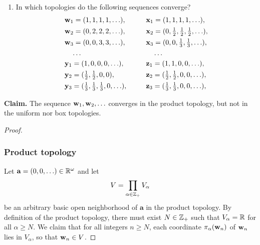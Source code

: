 \begin{solution}
    \begin{enumerate}[label={(\alph*)}, align=left, leftmargin=\parindent, listparindent=\parindent, labelwidth=0pt, itemindent=!]
        \addtocounter{enumi}{1} 
        \item In which topologies do the following sequences converge?
        \begin{alignat*}{2}
            & \mathbf{w}_1 = (1, 1, 1, 1, \ldots),\qquad   & & \mathbf{x}_1 = (1, 1, 1, 1, \ldots), \\
            & \mathbf{w}_2 = (0, 2, 2, 2, \ldots),\qquad   & & \mathbf{x}_2 = (0, \tfrac{1}{2}, \tfrac{1}{2}, \tfrac{1}{2}, \ldots), \\
            & \mathbf{w}_3 = (0, 0, 3, 3, \ldots),\qquad   & & \mathbf{x}_3 = (0, 0, \tfrac{1}{3}, \tfrac{1}{3}, \ldots), \\
            & \quad\ldots                           & & \quad\ldots \\
            & \mathbf{y}_1 = (1, 0, 0, 0, \ldots),\qquad   & & \mathbf{z}_1 = (1, 1, 0, 0, \ldots), \\
            & \mathbf{y}_2 = (\tfrac{1}{2}, \tfrac{1}{2}, 0, 0),                       & & \mathbf{z}_2 = (\tfrac{1}{2}, \tfrac{1}{2}, 0, 0, \ldots), \\
            & \mathbf{y}_3 = (\tfrac{1}{3}, \tfrac{1}{3}, \tfrac{1}{3}, 0, \ldots),    & & \mathbf{z}_3 = (\tfrac{1}{3}, \tfrac{1}{3}, 0, 0, \ldots), \\
        \end{alignat*}
    \end{enumerate}
    \textbf{Claim.} The sequence $\mathbf{w}_1, \mathbf{w}_2, \ldots$ converges in the product topology, but not in the uniform nor box topologies.
    \begin{proof}~

        \subsubsection*{Product topology}
        Let $\mathbf{a} = (0, 0, \ldots) \in \mathbb{R}^\omega$ and let
        \begin{equation*}
            V = \prod_{\alpha \in \mathbb{Z}_+} V_\alpha
        \end{equation*}
        be an arbitrary basic open neighborhood of $\mathbf{a}$ in the product topology.
        By definition of the product topology, there must exist $N \in \mathbb{Z}_+$ such that $V_\alpha = \mathbb{R}$ for all $\alpha \geq N$.
        We claim that for all integers $n \geq N$, each coordinate $\pi_\alpha(\mathbf{w}_n)$ of $\mathbf{w}_n$ lies in $V_\alpha$, so that $\mathbf{w}_n \in V$.


\end{proof}
\end{solution}
